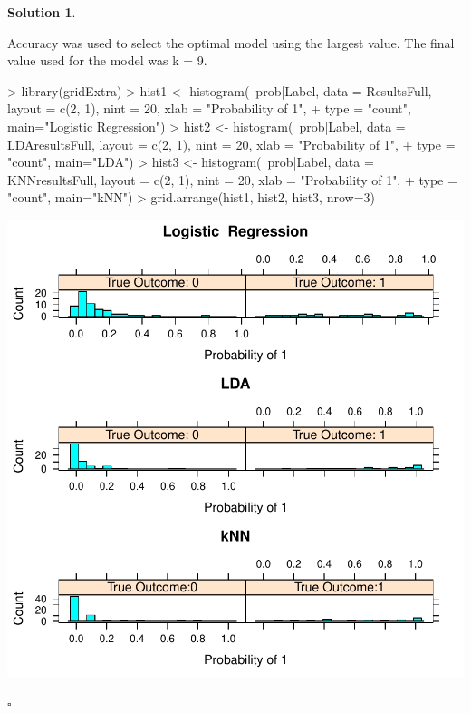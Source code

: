 \documentclass[twoside]{article}
\theoremstyle{definition}
\newtheorem*{solutionT}{Solution}
\newenvironment{solution}{\begin{cBox}\begin{solutionT}}{\hfill{\scriptsize\ensuremath{\square}}\end{solutionT}\end{cBox}}
\theoremstyle{definition}
\begin{document}
\begin{enumerate}
\begin{solution}
\begin{Schunk}
\begin{Soutput}
Accuracy was used to select the optimal model using the largest value.
The final value used for the model was k = 9.
\end{Soutput}
\end{Schunk}
\begin{Schunk}
\begin{Sinput}
> library(gridExtra)
> hist1 <- histogram(~prob|Label, data = ResultsFull, layout = c(2, 1), nint = 20, xlab = "Probability of 1",
+           type = "count", main="Logistic  Regression")
> hist2 <- histogram(~prob|Label, data = LDAresultsFull, layout = c(2, 1), nint = 20, xlab = "Probability of 1",
+           type = "count", main="LDA")
> hist3 <- histogram(~prob|Label, data = KNNresultsFull, layout = c(2, 1), nint = 20, xlab = "Probability of 1",
+           type = "count", main="kNN")
> grid.arrange(hist1, hist2, hist3, nrow=3)
\end{Sinput}
\end{Schunk}
\includegraphics{week5-010}


\end{solution}
\end{enumerate}
\end{document}
